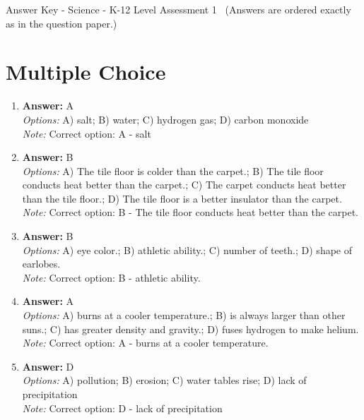 \documentclass[12pt]{article}
\begin{document}
\begin{center}
Answer Key - Science - K-12 Level Assessment 1 \
\small (Answers are ordered exactly as in the question paper.)
\end{center}

\section*{Multiple Choice}
\begin{enumerate}[label=\arabic*.]
\item \textbf{Answer:} A
\\ \textit{Options:} A) salt; B) water; C) hydrogen gas; D) carbon monoxide
\\ \textit{Note:} Correct option: A - salt
\item \textbf{Answer:} B
\\ \textit{Options:} A) The tile floor is colder than the carpet.; B) The tile floor conducts heat better than the carpet.; C) The carpet conducts heat better than the tile floor.; D) The tile floor is a better insulator than the carpet.
\\ \textit{Note:} Correct option: B - The tile floor conducts heat better than the carpet.
\item \textbf{Answer:} B
\\ \textit{Options:} A) eye color.; B) athletic ability.; C) number of teeth.; D) shape of earlobes.
\\ \textit{Note:} Correct option: B - athletic ability.
\item \textbf{Answer:} A
\\ \textit{Options:} A) burns at a cooler temperature.; B) is always larger than other suns.; C) has greater density and gravity.; D) fuses hydrogen to make helium.
\\ \textit{Note:} Correct option: A - burns at a cooler temperature.
\item \textbf{Answer:} D
\\ \textit{Options:} A) pollution; B) erosion; C) water tables rise; D) lack of precipitation
\\ \textit{Note:} Correct option: D - lack of precipitation
\end{enumerate}
\end{document}
